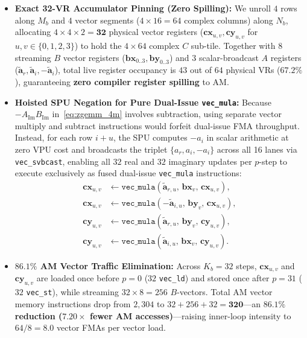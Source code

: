 \documentclass[journal]{IEEEtran}
\begin{document}
\begin{itemize}\setlength{\itemsep}{1pt}\setlength{\parskip}{0pt}
    \item \textbf{Exact 32-VR Accumulator Pinning (Zero Spilling):} We unroll $4$ rows along $M_b$ and $4$ vector segments ($4 \times 16 = 64$ complex columns) along $N_b$, allocating $4 \times 4 \times 2 = \mathbf{32}$ physical vector registers ($\mathbf{cx}_{u,v}, \mathbf{cy}_{u,v}$ for $u,v \in \{0,1,2,3\}$) to hold the $4 \times 64$ complex $C$ sub-tile. Together with $8$ streaming $B$ vector registers ($\mathbf{bx}_{0..3}, \mathbf{by}_{0..3}$) and $3$ scalar-broadcast $A$ registers ($\tilde{\mathbf{a}}_r, \tilde{\mathbf{a}}_i, -\tilde{\mathbf{a}}_i$), total live register occupancy is $43$ out of $64$ physical VRs ($67.2\%$), guaranteeing \textbf{zero compiler register spilling} to AM.
    \item \textbf{Hoisted SPU Negation for Pure Dual-Issue \texttt{vec\_mula}:} Because $-A_{\mathrm{Im}} B_{\mathrm{Im}}$ in~\eqref{eq:zgemm_4m} involves subtraction, using separate vector multiply and subtract instructions would forfeit dual-issue FMA throughput. Instead, for each row $i+u$, the SPU computes $-a_i$ in scalar arithmetic at zero VPU cost and broadcasts the triplet $\{a_r, a_i, -a_i\}$ across all 16 lanes via \texttt{vec\_svbcast}, enabling all $32$ real and $32$ imaginary updates per $p$-step to execute exclusively as fused dual-issue \texttt{vec\_mula} instructions:
    \begin{equation}
    \begin{aligned}
    \mathbf{cx}_{u,v} &\leftarrow \texttt{vec\_mula}(\tilde{\mathbf{a}}_{r,u},\, \mathbf{bx}_v,\, \mathbf{cx}_{u,v}), \\
    \mathbf{cx}_{u,v} &\leftarrow \texttt{vec\_mula}(-\tilde{\mathbf{a}}_{i,u},\, \mathbf{by}_v,\, \mathbf{cx}_{u,v}), \\
    \mathbf{cy}_{u,v} &\leftarrow \texttt{vec\_mula}(\tilde{\mathbf{a}}_{r,u},\, \mathbf{by}_v,\, \mathbf{cy}_{u,v}), \\
    \mathbf{cy}_{u,v} &\leftarrow \texttt{vec\_mula}(\tilde{\mathbf{a}}_{i,u},\, \mathbf{bx}_v,\, \mathbf{cy}_{u,v}).
    \end{aligned}
    \label{eq:vec_mula}
    \end{equation}
    \item \textbf{$86.1\%$ AM Vector Traffic Elimination:} Across $K_b = 32$ steps, $\mathbf{cx}_{u,v}$ and $\mathbf{cy}_{u,v}$ are loaded once before $p=0$ ($32$ \texttt{vec\_ld}) and stored once after $p=31$ ($32$ \texttt{vec\_st}), while streaming $32 \times 8 = 256$ $B$-vectors. Total AM vector memory instructions drop from $2{,}304$ to $32 + 256 + 32 = \mathbf{320}$---an \textbf{$86.1\%$ reduction ($7.20\times$ fewer AM accesses)}---raising inner-loop intensity to $64 / 8 = \mathbf{8.0}$ vector FMAs per vector load.
\end{itemize}
\end{document}
